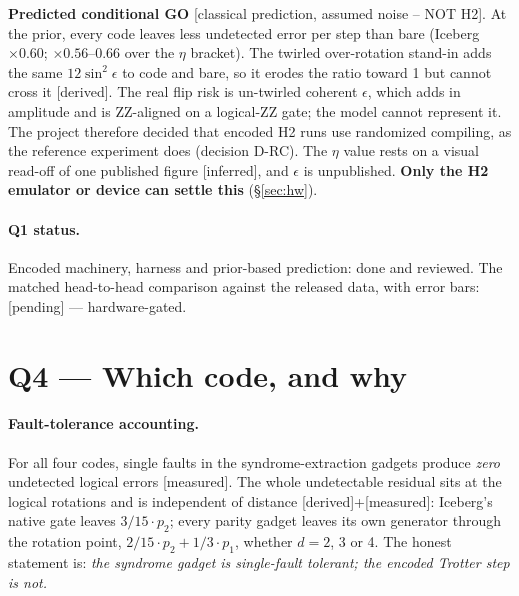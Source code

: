 \documentclass[11pt,a4paper]{article}
\newcommand{\tg}[1]{\textsf{\small[#1]}}
\newcommand{\der}{\tg{derived}}
\newcommand{\mea}{\tg{measured}}
\newcommand{\infr}{\tg{inferred}}
\newcommand{\pend}{\tg{pending}}
\newcommand{\cp}{\tg{classical prediction, assumed noise -- NOT H2}}
\begin{document}
\textbf{Predicted conditional GO} \cp. At the prior, every code leaves less undetected error per step than bare
(Iceberg $\times0.60$; $\times0.56$--$0.66$ over the $\eta$ bracket). The twirled over-rotation stand-in adds the
same $12\sin^2\epsilon$ to code and bare, so it erodes the ratio toward 1 but cannot cross it \der. The real flip
risk is un-twirled coherent $\epsilon$, which adds in amplitude and is ZZ-aligned on a logical-ZZ gate; the model
cannot represent it. The project therefore decided that encoded H2 runs use randomized compiling, as the
reference experiment does (decision D-RC). The $\eta$ value rests on a visual read-off of one published figure
\infr, and $\epsilon$ is unpublished. \textbf{Only the H2 emulator or device can settle this} (\S\ref{sec:hw}).

\paragraph{Q1 status.} Encoded machinery, harness and prior-based prediction: done and reviewed. The matched
head-to-head comparison against the released data, with error bars: \pend{} --- hardware-gated.

\section{Q4 --- Which code, and why}\label{sec:q4}

\paragraph{Fault-tolerance accounting.} For all four codes, single faults in the syndrome-extraction gadgets
produce \emph{zero} undetected logical errors \mea. The whole undetectable residual sits at the logical
rotations and is independent of distance \der{}+\mea: Iceberg's native gate leaves $3/15\cdot p_2$; every parity
gadget leaves its own generator through the rotation point, $2/15\cdot p_2+1/3\cdot p_1$, whether $d=2$, 3 or 4.
The honest statement is: \emph{the syndrome gadget is single-fault tolerant; the encoded Trotter step is not.}
\end{document}
